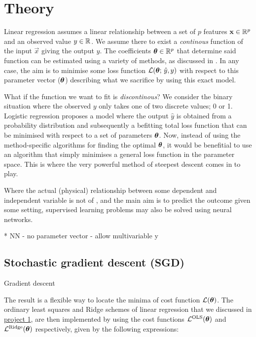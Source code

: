 \section{Theory}\label{sec:theory}

Linear regression assumes a linear relationship between a set of $p$ features $\vec{x}\in\RR[p]$ and an observed value $y\in\RR$. We assume there to exist a \textit{continous} function of the input $\vec{x}$ giving the output $\hat{y}$. The coefficients $\svec{\theta}\in\RR[p]$ that determine said function can be estimated using a variety of methods, as discussed in \projectOne. In any case, the aim is to minimise some loss function $\mathcal{L}(\svec{\theta};\,\hat{y}, y)$ with respect to this parameter vector ($\svec{\theta}$) describing what we sacrifice by using this exact model. 

What if the function we want to fit is \textit{discontinous}? We consider the binary situation where the observed $y$ only takes one of two discrete values; 0 or 1. Logistic regression proposes a model where the output $\hat{y}$ is obtained from  a probability distribution and subsequently a befitting total loss function that can be minimised with respect to a set of parameters $\svec{\theta}$. Now, instead of using the method-specific algorithms for finding the optimal $\svec{\theta}$, it would be benefitial to use an algorithm that simply minimises a general loss function in the parameter space. This is where the very powerful method of steepest descent comes in to play. \fillertext

Where the actual (physical) relationship between some dependent and independent variable is not of , and the main aim is to predict the outcome given some setting, supervised learning problems may also be solved using neural networks. 

\par{*} NN - no parameter vector - allow multivariable y



\subsection{Stochastic gradient descent (SGD)}\label{sec:stochastic_gradient_descent}
    Gradient descent \citep{mhjensen} 

    The result is a flexible way to locate the minima of  cost function $\mathcal{L}(\svec{\theta})$. The ordinary least squares and Ridge schemes of linear regression that we discussed in \href{https://github.com/Johanmkr/FYS-STK4155colab/tree/main/project1}{project 1}, are then implemented by using the cost functions $\mathcal{L}^\mathrm{OLS}(\svec{\theta})$ and $\mathcal{L}^\mathrm{Ridge}(\svec{\theta})$ respectively, given by the following expressions:

